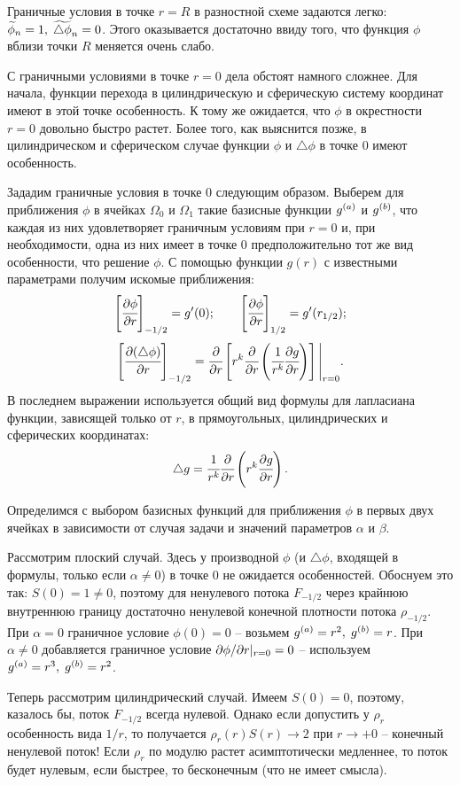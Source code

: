 Граничные условия в точке $r = R$ в разностной схеме задаются легко: ${\widetilde{\phi}}_n = 1, \; {\widetilde{\triangle \phi}}_n = 0$. Этого оказывается достаточно ввиду того, что функция $\phi$ вблизи точки $R$ меняется очень слабо.

С граничными условиями в точке $r = 0$ дела обстоят намного сложнее. Для начала, функции перехода в цилиндрическую и сферическую систему координат имеют в этой точке особенность. К тому же ожидается, что $\phi$ в окрестности $r = 0$ довольно быстро растет. Более того, как выяснится позже, в цилиндрическом и сферическом случае функции $\phi$ и $\triangle \phi$ в точке $0$ имеют особенность.

Зададим граничные условия в точке $0$ следующим образом. Выберем для приближения $\phi$ в ячейках $\Omega_0$ и $\Omega_1$ такие базисные функции ${g^{(a)}}$ и ${g^{(b)}}$, что каждая из них удовлетворяет граничным условиям при $r = 0$ и, при необходимости, одна из них имеет в точке $0$ предположительно тот же вид особенности, что решение $\phi$. С помощью функции $g(r)$ с известными параметрами получим искомые приближения:
$${\left[ \cfrac{\partial \phi}{\partial r} \right]}_{-1/2} = g'(0); \qquad {\left[ \cfrac{\partial \phi}{\partial r} \right]}_{1/2} = g'(r_{1/2}) {\text{;}}$$
$${\left[ \cfrac{\partial (\triangle \phi)}{\partial r} \right]}_{-1/2} = \cfrac{\partial }{\partial r} \left[ r^k \cfrac{\partial }{\partial r} \left(\cfrac{1}{r^k} \cfrac{\partial g}{\partial r} \right) \right] \Bigg|_{r = 0} {\text{.}}$$
В последнем выражении используется общий вид формулы для лапласиана функции, зависящей только от $r$, в прямоугольных, цилиндрических и сферических координатах:
\begin{equation}
	\triangle g = \cfrac{1}{r^k} \cfrac{\partial }{\partial r} \left( r^k \cfrac{\partial g}{\partial r} \right) {\text{.}}
	\label{eq:laplasian_common}
\end{equation}

Определимся с выбором базисных функций для приближения $\phi$ в первых двух ячейках в зависимости от случая задачи и значений параметров $\alpha$ и $\beta$.

Рассмотрим плоский случай. Здесь у производной $\phi$ (и $\triangle \phi$, входящей в формулы, только если $\alpha \neq 0$) в точке $0$ не ожидается особенностей. Обоснуем это так: $S(0) = 1 \neq 0$, поэтому для ненулевого потока $F_{-1/2}$ через крайнюю внутреннюю границу достаточно ненулевой конечной плотности потока $\rho_{-1/2}$. При $\alpha = 0$ граничное условие $\phi(0) = 0$ -- возьмем ${g^{(a)}} = r^2, \; {g^{(b)}} = r$. При $\alpha \neq 0$ добавляется граничное условие $\partial \phi / \partial r |_{r = 0} = 0$ -- используем ${g^{(a)}} = r^3, \; {g^{(b)}} = r^2$.

Теперь рассмотрим цилиндрический случай. Имеем $S(0) = 0$, поэтому, казалось бы, поток $F_{-1/2}$ всегда нулевой. Однако если допустить у $\rho_r$ особенность вида $1/r$, то получается $\rho_r(r) S(r) \to 2$ при $r \to +0$ -- конечный ненулевой поток! Если $\rho_r$ по модулю растет асимптотически медленнее, то поток будет нулевым, если быстрее, то бесконечным (что не имеет смысла).

